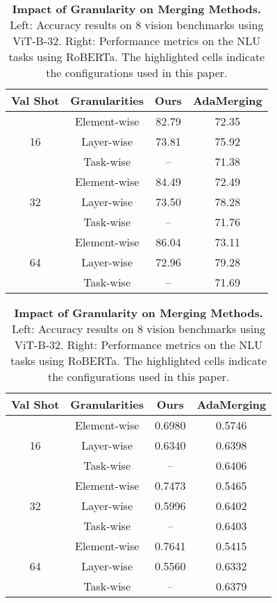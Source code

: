 \begin{table}[!h]
\centering
\begin{tabular}{cc|c c}
\toprule
Val Shot       & Granularities       & Ours   & AdaMerging \\ 
\midrule
\multirow{3}{*}{16} & Element-wise & \cellcolor{lightyellow}82.79 & 72.35     \\ 
& Layer-wise   & 73.81 & \cellcolor{lightyellow}75.92     \\ 
& Task-wise    & --      & 71.38     \\ 
\midrule
\multirow{3}{*}{32} & Element-wise & \cellcolor{lightyellow}84.49 & 72.49     \\ 
& Layer-wise   & 73.50 & \cellcolor{lightyellow}78.28     \\ 
& Task-wise    & --      & 71.76     \\ 
\midrule
\multirow{3}{*}{64} & Element-wise & \cellcolor{lightyellow}86.04 & 73.11     \\ 
& Layer-wise   & 72.96 & \cellcolor{lightyellow}79.28     \\ 
& Task-wise    & --      & 71.69     \\ 
\bottomrule
\end{tabular}
\hspace{1cm} %
\begin{tabular}{cc|c c}
\toprule
Val Shot       & Granularities       & Ours   & AdaMerging \\ 
\midrule
\multirow{3}{*}{16} & Element-wise & \cellcolor{lightyellow}0.6980 & 0.5746     \\ 
& Layer-wise   & 0.6340 & \cellcolor{lightyellow}0.6398     \\ 
& Task-wise    & -- & 0.6406     \\ 
\midrule
\multirow{3}{*}{32} & Element-wise & \cellcolor{lightyellow}0.7473 & 0.5465     \\ 
& Layer-wise   &  0.5996 & \cellcolor{lightyellow}0.6402     \\ 
& Task-wise    & -- & 0.6403     \\ 
\midrule
\multirow{3}{*}{64} & Element-wise & \cellcolor{lightyellow}0.7641 & 0.5415     \\ 
& Layer-wise   & 0.5560 & \cellcolor{lightyellow}0.6332     \\ 
& Task-wise    & -- & 0.6379     \\ 
\bottomrule
\end{tabular}
\caption{\textbf{Impact of Granularity on Merging Methods.} Left: Accuracy results on 8 vision benchmarks using ViT-B-32. Right: Performance metrics on the NLU tasks using RoBERTa. The highlighted cells indicate the configurations used in this paper.}
\label{tab: granularities}
\end{table}


